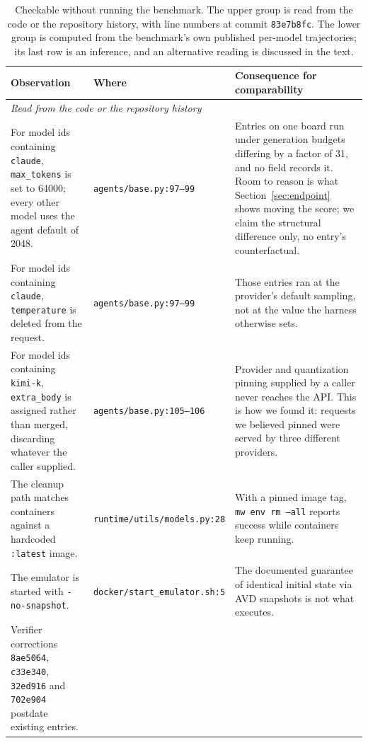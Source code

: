 \begin{table}[t]
\centering\footnotesize
\caption{Checkable without running the benchmark. The upper group is read from
the code or the repository history, with line numbers at commit
\texttt{83e7b8fc}. The lower group is computed from the benchmark's own
published per-model trajectories; its last row is an inference, and an
alternative reading is discussed in the text.}
\label{tab:zero}
\begin{tabular}{p{}p{}p{}}
\toprule
\textbf{Observation} & \textbf{Where} & \textbf{Consequence for comparability} \\
\midrule
\multicolumn{3}{l}{\textit{Read from the code or the repository history}} \\
\addlinespace
For model ids containing \texttt{claude}, \texttt{max\_tokens} is set to 64000;
every other model uses the agent default of 2048.
& \texttt{agents/base.py:97--99}
& Entries on one board run under generation budgets differing by a factor of
31, and no field records it. Room to reason is what
Section~\ref{sec:endpoint} shows moving the score; we claim the structural
difference only, no entry's counterfactual. \\
\addlinespace
For model ids containing \texttt{claude}, \texttt{temperature} is deleted from
the request.
& \texttt{agents/base.py:97--99}
& Those entries ran at the provider's default sampling, not at the value the
harness otherwise sets. \\
\addlinespace
For model ids containing \texttt{kimi-k}, \texttt{extra\_body} is assigned
rather than merged, discarding whatever the caller supplied.
& \texttt{agents/base.py:105--106}
& Provider and quantization pinning supplied by a caller never reaches the API.
This is how we found it: requests we believed pinned were served by three
different providers. \\
\addlinespace
The cleanup path matches containers against a hardcoded \texttt{:latest} image.
& \texttt{runtime/utils/}\allowbreak\texttt{models.py:28}
& With a pinned image tag, \texttt{mw env rm --all} reports success while
containers keep running. \\
\addlinespace
The emulator is started with \texttt{-no-snapshot}.
& \texttt{docker/}\allowbreak\texttt{start\_emulator.sh:5}
& The documented guarantee of identical initial state via AVD snapshots is not
what executes. \\
\addlinespace
Verifier corrections \texttt{8ae5064}, \texttt{c33e340}, \texttt{32ed916} and
\texttt{702e904} postdate existing entries.

\end{tabular}
\end{table}
